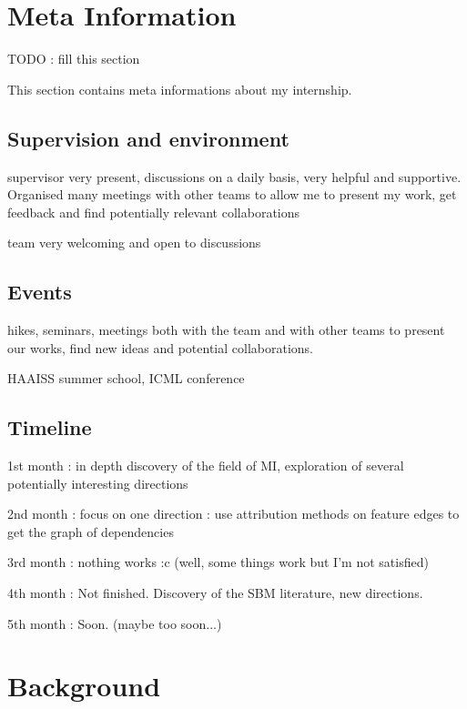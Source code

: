 \documentclass{article}
\begin{document}
\section{Meta Information}
\label{sec:meta}

TODO : fill this section

This section contains meta informations about my internship.

\subsection{Supervision and environment}

supervisor very present, discussions on a daily basis, very helpful and supportive. Organised many meetings with other teams to allow me to present my work, get feedback and find potentially relevant collaborations

team very welcoming and open to discussions

\subsection{Events}

hikes, seminars, meetings both with the team and with other teams to present our works, find new ideas and potential collaborations.

HAAISS summer school, ICML conference

\subsection{Timeline}

1st month : in depth discovery of the field of MI, exploration of several potentially interesting directions

2nd month : focus on one direction : use attribution methods on feature edges to get the graph of dependencies

3rd month : nothing works :c (well, some things work but I'm not satisfied)

4th month : Not finished. Discovery of the SBM literature, new directions. %

5th month : Soon. (maybe too soon...)

\section{Background}
\end{document}
